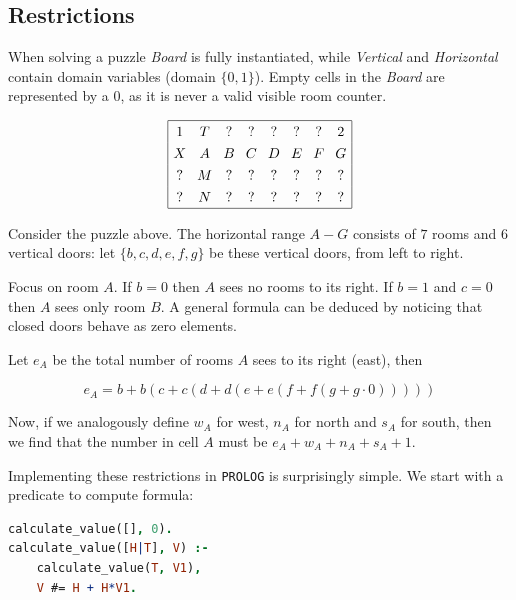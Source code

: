 \documentclass[runningheads]{llncs}
\newcommand*{\cc}[2]{\multicolumn{1}{#1}{#2}}
\begin{document}
\subsection{Restrictions}
\label{subsec:solutionrestrictions}

When solving a puzzle \textsl{Board} is fully instantiated, while \textsl{Vertical} and \textsl{Horizontal} contain domain variables (domain $\{0,1\}$). Empty cells in the \textsl{Board} are represented by a $0$, as it is never a valid visible room counter.

\begin{equation*}
\arraycolsep=4.0pt\def\arraystretch{1.3}
\begin{array}[c]{|c c c c c c c c|}
\hline
1 & \cc{ c }{T} & \cc{ c }{?} & \cc{ c }{?} & \cc{ c }{?} & \cc{ c }{?} & \cc{ c }{?} & 2\\
%
X & \cc{ c }{A} & \cc{ c }{B} & \cc{ c }{C} & \cc{ c }{D} & \cc{ c }{E} & \cc{ c }{F} & G\\
%
? & \cc{ c }{M} & \cc{ c }{?} & \cc{ c }{?} & \cc{ c }{?} & \cc{ c }{?} & \cc{ c }{?} & ?\\
%
? & \cc{ c }{N} & \cc{ c }{?} & \cc{ c }{?} & \cc{ c }{?} & \cc{ c }{?} & \cc{ c }{?} & ?\\
\hline
\end{array}
\end{equation*}

Consider the puzzle above. The horizontal range $A-G$ consists of $7$ rooms and $6$ vertical doors: let $\{b,c,d,e,f,g\}$ be these vertical doors, from left to right.

Focus on room $A$.
If $b=0$ then $A$ sees no rooms to its right. If $b=1$ and $c=0$ then $A$ sees only room $B$.
A general formula can be deduced by noticing that closed doors behave as zero elements.

Let $e_A$ be the total number of rooms $A$ sees to its right (east), then

\begin{equation}\label{eq:acc}
e_A=b+b(c+c(d+d(e+e(f+f(g+g\cdot 0)))))
\end{equation}

Now, if we analogously define $w_A$ for west, $n_A$ for north and $s_A$ for south, then we find that the number in cell $A$ must be $e_A+w_A+n_A+s_A+1$.

Implementing these restrictions in \texttt{PROLOG} is surprisingly simple. We start with a predicate to compute formula:

\begin{center}
\begin{minipage}{0.45\textwidth}
\centering\ttfamily
\begin{lstlisting}[language=Prolog]
calculate_value([], 0).
calculate_value([H|T], V) :-
    calculate_value(T, V1),
    V #= H + H*V1.
\end{lstlisting}
\end{minipage}
\end{center}
\end{document}
